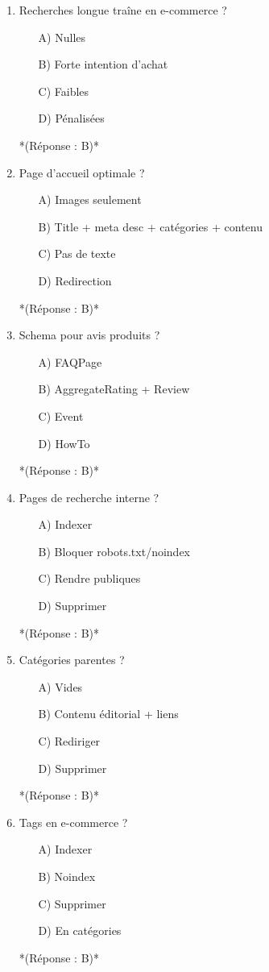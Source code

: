 \documentclass[12pt,a4paper,twoside]{report}
\begin{document}
\begin{enumerate}
\item Recherches longue traîne en e-commerce ?
\begin{itemize}
\item[A)] Nulles
\item[B)] Forte intention d'achat
\item[C)] Faibles
\item[D)] Pénalisées
\end{itemize}
*(Réponse : B)*

\item Page d'accueil optimale ?
\begin{itemize}
\item[A)] Images seulement
\item[B)] Title + meta desc + catégories + contenu
\item[C)] Pas de texte
\item[D)] Redirection
\end{itemize}
*(Réponse : B)*

\item Schema pour avis produits ?
\begin{itemize}
\item[A)] FAQPage
\item[B)] AggregateRating + Review
\item[C)] Event
\item[D)] HowTo
\end{itemize}
*(Réponse : B)*

\item Pages de recherche interne ?
\begin{itemize}
\item[A)] Indexer
\item[B)] Bloquer robots.txt/noindex
\item[C)] Rendre publiques
\item[D)] Supprimer
\end{itemize}
*(Réponse : B)*

\item Catégories parentes ?
\begin{itemize}
\item[A)] Vides
\item[B)] Contenu éditorial + liens
\item[C)] Rediriger
\item[D)] Supprimer
\end{itemize}
*(Réponse : B)*

\item Tags en e-commerce ?
\begin{itemize}
\item[A)] Indexer
\item[B)] Noindex
\item[C)] Supprimer
\item[D)] En catégories
\end{itemize}
*(Réponse : B)*


\end{enumerate}
\end{document}
